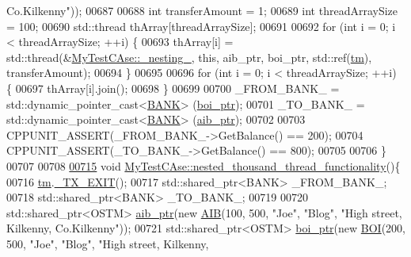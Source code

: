 \begin{DoxyCode}
{       Co.Kilkenny"}));
00687     
00688     \textcolor{keywordtype}{int} transferAmount = 1;
00689     \textcolor{keywordtype}{int} threadArraySize = 100; 
00690     std::thread thArray[threadArraySize];
00691 
00692     \textcolor{keywordflow}{for} (\textcolor{keywordtype}{int} i = 0; i < threadArraySize; ++i) \{
00693         thArray[i] = std::thread(&\hyperlink{class_my_test_c_ase_abb973a1396c1083891d76845e2cfaf64_abb973a1396c1083891d76845e2cfaf64}{MyTestCAse::\_nesting\_}, \textcolor{keyword}{this}, aib\_ptr, boi\_ptr, 
      std::ref(\hyperlink{class_my_test_c_ase_a422e6e5d4ddedea384be96031c89b72b_a422e6e5d4ddedea384be96031c89b72b}{tm}), transferAmount);
00694     \}
00695     
00696     \textcolor{keywordflow}{for} (\textcolor{keywordtype}{int} i = 0; i < threadArraySize; ++i) \{
00697         thArray[i].join();
00698     \}
00699     
00700     \_FROM\_BANK\_ = std::dynamic\_pointer\_cast<\hyperlink{class_b_a_n_k}{BANK}> (\hyperlink{class_my_test_c_ase_a5554de9e3e6393a89c66c036c529720b_a5554de9e3e6393a89c66c036c529720b}{boi\_ptr});
00701     \_TO\_BANK\_ = std::dynamic\_pointer\_cast<\hyperlink{class_b_a_n_k}{BANK}> (\hyperlink{class_my_test_c_ase_adad50e8278b64aa0321000b528e5362c_adad50e8278b64aa0321000b528e5362c}{aib\_ptr});
00702     
00703     CPPUNIT\_ASSERT(\_FROM\_BANK\_->GetBalance() == 200);
00704     CPPUNIT\_ASSERT(\_TO\_BANK\_->GetBalance() == 800);
00705     
00706 \}
00707 
00708 
\hypertarget{_my_test_c_ase_8cpp_source.tex_l00715}{}\hyperlink{class_my_test_c_ase_a3937532fe2a85f7e61518b8abffdb09a_a3937532fe2a85f7e61518b8abffdb09a}{00715} \textcolor{keywordtype}{void} \hyperlink{class_my_test_c_ase_a3937532fe2a85f7e61518b8abffdb09a_a3937532fe2a85f7e61518b8abffdb09a}{MyTestCAse::nested\_thousand\_thread\_functionality}()\{
00716     \hyperlink{class_my_test_c_ase_a422e6e5d4ddedea384be96031c89b72b_a422e6e5d4ddedea384be96031c89b72b}{tm}.\hyperlink{class_t_m_a5e2d1127f2429f2f524d25f430eade06_a5e2d1127f2429f2f524d25f430eade06}{\_TX\_EXIT}();
00717     std::shared\_ptr<BANK> \_FROM\_BANK\_;
00718     std::shared\_ptr<BANK> \_TO\_BANK\_;
00719     
00720     std::shared\_ptr<OSTM> \hyperlink{class_my_test_c_ase_adad50e8278b64aa0321000b528e5362c_adad50e8278b64aa0321000b528e5362c}{aib\_ptr}(\textcolor{keyword}{new} \hyperlink{class_a_i_b}{AIB}(100, 500, \textcolor{stringliteral}{"Joe"}, \textcolor{stringliteral}{"Blog"}, \textcolor{stringliteral}{"High street, Kilkenny,
       Co.Kilkenny"}));
00721     std::shared\_ptr<OSTM> \hyperlink{class_my_test_c_ase_a5554de9e3e6393a89c66c036c529720b_a5554de9e3e6393a89c66c036c529720b}{boi\_ptr}(\textcolor{keyword}{new} \hyperlink{class_b_o_i}{BOI}(200, 500, \textcolor{stringliteral}{"Joe"}, \textcolor{stringliteral}{"Blog"}, \textcolor{stringliteral}{"High street, Kilkenny,
}
\end{DoxyCode}
